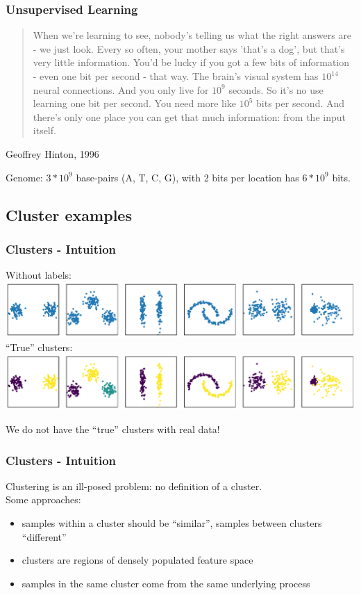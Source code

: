 \documentclass[Nike]{tuberlinbeamer}
\begin{document}
\begin{frame}
 \frametitle{Unsupervised Learning}
  \begin{center}
    \begin{quote}
      When we’re learning to see, nobody's telling us what the right
      answers are - we just look. Every so often, your mother says
      ’that's a dog’, but that's very little information. You'd be lucky if
      you got a few bits of information - even one bit per second - that
      way. The brain's visual system has $10^{14}$ neural connections. And
      you only live for $10^9$ seconds. So it's no use learning one bit per
      second. You need more like $10^5$ bits per second. And there's only
      one place you can get that much information: from the input
      itself.
    \end{quote}
  Geoffrey Hinton, 1996
  \end{center}
  Genome: $3 * 10^9$ base-pairs (A, T, C, G), with 2 bits per location has  $6 * 10^9$ bits.
\end{frame}


\subsection{Cluster examples}
\begin{frame}
 \frametitle{Clusters - Intuition}
  \begin{center}
    Without labels:
    \centering\includegraphics[width=1.0\textwidth]{sample_clusters.pdf}
    \pause
    ``True'' clusters:
    \centering\includegraphics[width=1.0\textwidth]{sample_clusters_true_assignment.pdf}
  \end{center}
  We do not have the ``true'' clusters with real data!
\end{frame}

\begin{frame}
 \frametitle{Clusters - Intuition}
  Clustering is an ill-posed problem: no definition of a cluster.\\
  Some approaches:
  \begin{itemize}
    \item samples within a cluster should be ``similar'', samples between clusters ``different''
    \item clusters are regions of densely populated feature space
    \item samples in the same cluster come from the same underlying process
  \end{itemize}
\end{frame}
\end{document}

